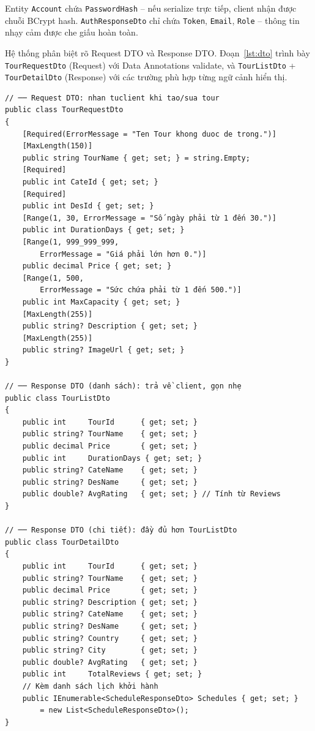 Entity \texttt{Account} chứa \texttt{PasswordHash} -- nếu
serialize trực tiếp, client nhận được chuỗi BCrypt hash.
\texttt{AuthResponseDto} chỉ chứa \texttt{Token}, \texttt{Email},
\texttt{Role} -- thông tin nhạy cảm được che giấu hoàn toàn.
\QEDAa

Hệ thống phân biệt rõ Request DTO và Response DTO. Đoạn~\ref{lst:dto}
trình bày \texttt{TourRequestDto} (Request) với Data Annotations
validate, và \texttt{TourListDto} + \texttt{TourDetailDto}
(Response) với các trường phù hợp từng ngữ cảnh hiển thị.

\begin{lstlisting}[style=csharp,
  caption={Request DTO và Response DTO cho Tour},
  label={lst:dto}]
// ── Request DTO: nhan tuclient khi tao/sua tour
public class TourRequestDto
{
    [Required(ErrorMessage = "Ten Tour khong duoc de trong.")]
    [MaxLength(150)]
    public string TourName { get; set; } = string.Empty;
    [Required]
    public int CateId { get; set; }
    [Required]
    public int DesId { get; set; }
    [Range(1, 30, ErrorMessage = "Số ngày phải từ 1 đến 30.")]
    public int DurationDays { get; set; }
    [Range(1, 999_999_999,
        ErrorMessage = "Giá phải lớn hơn 0.")]
    public decimal Price { get; set; }
    [Range(1, 500,
        ErrorMessage = "Sức chứa phải từ 1 đến 500.")]
    public int MaxCapacity { get; set; }
    [MaxLength(255)]
    public string? Description { get; set; }
    [MaxLength(255)]
    public string? ImageUrl { get; set; }
}

// ── Response DTO (danh sách): trả về client, gọn nhẹ
public class TourListDto
{
    public int     TourId      { get; set; }
    public string? TourName    { get; set; }
    public decimal Price       { get; set; }
    public int     DurationDays { get; set; }
    public string? CateName    { get; set; }
    public string? DesName     { get; set; }
    public double? AvgRating   { get; set; } // Tính từ Reviews
}

// ── Response DTO (chi tiết): đầy đủ hơn TourListDto
public class TourDetailDto
{
    public int     TourId      { get; set; }
    public string? TourName    { get; set; }
    public decimal Price       { get; set; }
    public string? Description { get; set; }
    public string? CateName    { get; set; }
    public string? DesName     { get; set; }
    public string? Country     { get; set; }
    public string? City        { get; set; }
    public double? AvgRating   { get; set; }
    public int     TotalReviews { get; set; }
    // Kèm danh sách lịch khởi hành
    public IEnumerable<ScheduleResponseDto> Schedules { get; set; }
        = new List<ScheduleResponseDto>();
}
\end{lstlisting}

